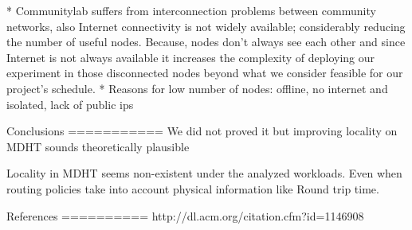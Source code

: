 * Communitylab suffers from interconnection problems between community networks, also Internet connectivity is not widely available; considerably reducing the number of useful nodes. Because, nodes don't always see each other and since Internet is not always available it increases the complexity of deploying our experiment in those disconnected nodes beyond what we consider feasible for our project's schedule.
* Reasons for low number of nodes: offline, no internet and isolated, lack of public ips


Conclusions
===========
We did not proved it but improving locality on MDHT sounds theoretically plausible

Locality in MDHT seems non-existent under the analyzed workloads. Even when routing policies take into account physical information like Round trip time.


References
==========
http://dl.acm.org/citation.cfm?id=1146908
